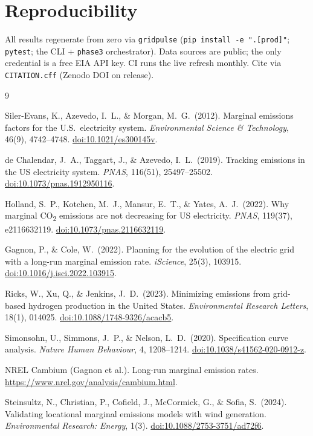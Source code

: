 \documentclass[11pt]{article}
\newcommand{\coo}{CO\textsubscript{2}}
\begin{document}
\section{Reproducibility}

All results regenerate from zero via \texttt{gridpulse}
(\texttt{pip install -e ".[prod]"}; \texttt{pytest}; the CLI + \texttt{phase3}
orchestrator). Data sources are public; the only credential is a free EIA API key.
CI runs the live refresh monthly. Cite via \texttt{CITATION.cff} (Zenodo DOI on
release).

\begin{thebibliography}{9}

Siler-Evans, K., Azevedo, I.\ L., \& Morgan, M.\ G.\ (2012).
Marginal emissions factors for the U.S.\ electricity system.
\textit{Environmental Science \& Technology}, 46(9), 4742--4748.
\href{https://doi.org/10.1021/es300145v}{doi:10.1021/es300145v}.

de Chalendar, J.\ A., Taggart, J., \& Azevedo, I.\ L.\ (2019).
Tracking emissions in the US electricity system.
\textit{PNAS}, 116(51), 25497--25502.
\href{https://doi.org/10.1073/pnas.1912950116}{doi:10.1073/pnas.1912950116}.

Holland, S.\ P., Kotchen, M.\ J., Mansur, E.\ T., \& Yates, A.\ J.\ (2022).
Why marginal \coo{} emissions are not decreasing for US electricity.
\textit{PNAS}, 119(37), e2116632119.
\href{https://doi.org/10.1073/pnas.2116632119}{doi:10.1073/pnas.2116632119}.

Gagnon, P., \& Cole, W.\ (2022).
Planning for the evolution of the electric grid with a long-run marginal emission
rate. \textit{iScience}, 25(3), 103915.
\href{https://doi.org/10.1016/j.isci.2022.103915}{doi:10.1016/j.isci.2022.103915}.

Ricks, W., Xu, Q., \& Jenkins, J.\ D.\ (2023).
Minimizing emissions from grid-based hydrogen production in the United States.
\textit{Environmental Research Letters}, 18(1), 014025.
\href{https://doi.org/10.1088/1748-9326/acacb5}{doi:10.1088/1748-9326/acacb5}.

Simonsohn, U., Simmons, J.\ P., \& Nelson, L.\ D.\ (2020).
Specification curve analysis.
\textit{Nature Human Behaviour}, 4, 1208--1214.
\href{https://doi.org/10.1038/s41562-020-0912-z}{doi:10.1038/s41562-020-0912-z}.

NREL Cambium (Gagnon et al.). Long-run marginal emission rates.
\url{https://www.nrel.gov/analysis/cambium.html}.

Steinsultz, N., Christian, P., Cofield, J., McCormick, G., \& Sofia, S.\ (2024).
Validating locational marginal emissions models with wind generation.
\textit{Environmental Research: Energy}, 1(3).
\href{https://doi.org/10.1088/2753-3751/ad72f6}{doi:10.1088/2753-3751/ad72f6}.

\end{thebibliography}
\end{document}
